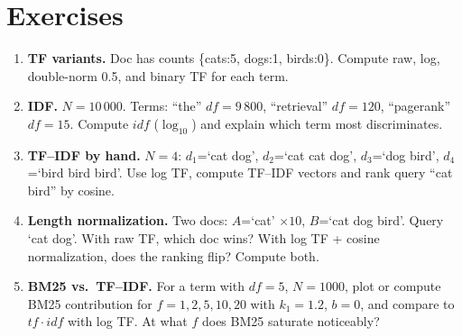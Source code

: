 \section{Exercises}
\begin{enumerate}[label=E3.\arabic*, leftmargin=*, itemsep=0.6em]
  \item \textbf{TF variants.} Doc has counts \{cats:5, dogs:1, birds:0\}. Compute raw, log, double-norm 0.5, and binary TF for each term.
  \item \textbf{IDF.} $N=10\,000$. Terms: ``the'' $df=9\,800$, ``retrieval'' $df=120$, ``pagerank'' $df=15$. Compute $idf$ ($\log_{10}$) and explain which term most discriminates.
  \item \textbf{TF--IDF by hand.} $N=4$: $d_1$=`cat dog', $d_2$=`cat cat dog', $d_3$=`dog bird', $d_4$=`bird bird bird'. Use log TF, compute TF--IDF vectors and rank query ``cat bird'' by cosine.
  \item \textbf{Length normalization.} Two docs: $A$=`cat' $\times10$, $B$=`cat dog bird'. Query `cat dog'. With raw TF, which doc wins? With log TF + cosine normalization, does the ranking flip? Compute both.
  \item \textbf{BM25 vs.\ TF--IDF.} For a term with $df=5$, $N=1000$, plot or compute BM25 contribution for $f=1,2,5,10,20$ with $k_1=1.2$, $b=0$, and compare to $tf\cdot idf$ with log TF. At what $f$ does BM25 saturate noticeably?
\end{enumerate}

